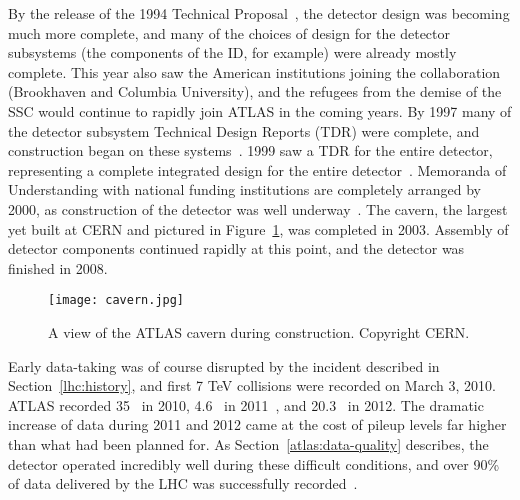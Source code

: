 By the release of the 1994 Technical Proposal~\cite{ATLASTP}, the detector design was becoming much more complete, and many of the choices of design for the detector subsystems (the components of the ID, for example) were already mostly complete. This year also saw the American institutions joining the collaboration (Brookhaven and Columbia University), and the refugees from the demise of the SSC would continue to rapidly join ATLAS in the coming years.  By 1997 many of the detector subsystem Technical Design Reports (TDR) were complete, and construction began on these systems~\cite{ATLASHistory}. 1999 saw a TDR for the entire detector, representing a complete integrated design for the entire detector~\cite{tdr1,tdr2}. Memoranda of Understanding with national funding institutions are completely arranged by 2000, as construction of the detector was well underway~\cite{ATLASHistory}. The cavern, the largest yet built at CERN and pictured in Figure~\ref{fig:detector:cavern}, was completed in 2003. Assembly of detector components continued rapidly at this point, and the detector was finished in 2008.


\begin{figure}
\centering
\texttt{[image: cavern.jpg]}
\label{fig:detector:cavern}
\caption{A view of the ATLAS cavern during construction. Copyright CERN.}
\end{figure}


Early data-taking was of course disrupted by the incident described in Section~\ref{lhc:history}, and first 7 TeV collisions were recorded on March 3, 2010. ATLAS recorded 35 \ipb~in 2010, 4.6 \ifb~in 2011~\cite{ATLASLumi}, and 20.3 \ifb~in 2012. The dramatic increase of data during 2011 and 2012 came at the cost of pileup levels far higher than what had been planned for. As Section~\ref{atlas:data-quality} describes, the detector operated incredibly well during these difficult conditions, and over 90\% of data delivered by the LHC was successfully recorded~\cite{ATLASDQ}.









